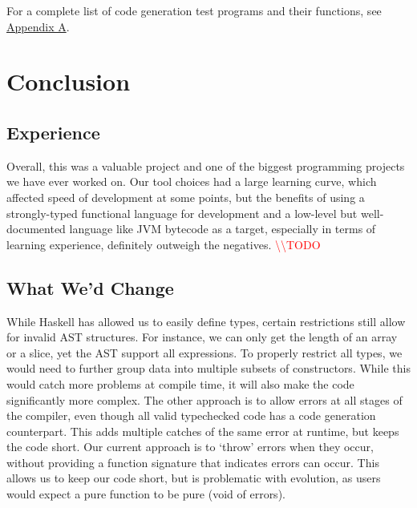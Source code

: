 \documentclass[11pt]{article}
\newcommand{\todo}[0]{\textcolor{red}{\textbackslash\textbackslash TODO \ }}
\begin{document}
For a complete list of code generation test programs and their functions, see
\hyperref[sec:appendixa]{Appendix A}.

\section{Conclusion}
\subsection{Experience}
Overall, this was a valuable project and one of the biggest programming projects
we have ever worked on. Our tool choices had a large learning curve, which
affected speed of development at some points, but the benefits of using a
strongly-typed functional language for development and a low-level but
well-documented language like JVM bytecode as a target, especially in terms of
learning experience, definitely outweigh the negatives. \todo

\subsection{What We'd Change}

While Haskell has allowed us to easily define types, certain
restrictions still allow for invalid AST structures.  For instance, we
can only get the length of an array or a slice, yet the AST support
all expressions.  To properly restrict all types, we would need to
further group data into multiple subsets of constructors\cite{so:pattern/matching/subset}.  While this
would catch more problems at compile time, it will also make the code
significantly more complex.  The other approach is to allow errors at
all stages of the compiler, even though all valid typechecked code has
a code generation counterpart.  This adds multiple catches of the same error
at runtime, but keeps the code short.  Our current approach is to
`throw' errors when they occur, without providing a function signature
that indicates errors can occur.  This allows us to keep our code
short, but is problematic with evolution, as users would expect a pure
function to be pure (void of errors).
\end{document}
